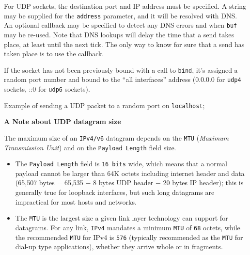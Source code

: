 For UDP sockets, the destination port and IP address must be specified.
A string may be supplied for the \texttt{address} parameter, and it will
be resolved with DNS. An optional callback may be specified to detect
any DNS errors and when \texttt{buf} may be re-used. Note that DNS
lookups will delay the time that a send takes place, at least until the
next tick. The only way to know for sure that a send has taken place is
to use the callback.

If the socket has not been previously bound with a call to
\texttt{bind}, it's assigned a random port number and bound to the ``all
interfaces'' address (0.0.0.0 for \texttt{udp4} sockets, ::0 for
\texttt{udp6} sockets).

Example of sending a UDP packet to a random port on \texttt{localhost};

\begin{Shaded}
\begin{Highlighting}[]
 \NormalTok{);}
  \NormalTok{);}
 \NormalTok{(}\NormalTok{);}
\NormalTok{, }\NormalTok{, }\NormalTok{, }\NormalTok{, }
  \NormalTok{();}
\NormalTok{\});}
\end{Highlighting}
\end{Shaded}

\textbf{A Note about UDP datagram size}

The maximum size of an \texttt{IPv4/v6} datagram depends on the
\texttt{MTU} (\emph{Maximum Transmission Unit}) and on the
\texttt{Payload Length} field size.

\begin{itemize}
\item
  The \texttt{Payload Length} field is \texttt{16 bits} wide, which
  means that a normal payload cannot be larger than 64K octets including
  internet header and data (65,507 bytes = 65,535 − 8 bytes UDP header −
  20 bytes IP header); this is generally true for loopback interfaces,
  but such long datagrams are impractical for most hosts and networks.
\item
  The \texttt{MTU} is the largest size a given link layer technology can
  support for datagrams. For any link, \texttt{IPv4} mandates a minimum
  \texttt{MTU} of \texttt{68} octets, while the recommended \texttt{MTU}
  for IPv4 is \texttt{576} (typically recommended as the \texttt{MTU}
  for dial-up type applications), whether they arrive whole or in
  fragments.
\end{itemize}

